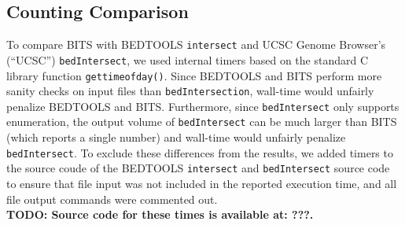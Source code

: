 \subsection{Counting Comparison}
To compare BITS with BEDTOOLS {\tt intersect} and UCSC Genome Browser’s
(``UCSC'') {\tt bedIntersect}, we used internal timers based on the standard C
library function {\tt gettimeofday()}.  Since BEDTOOLS and BITS perform more
sanity checks on input files than {\tt bedIntersection}, wall-time would
unfairly penalize BEDTOOLS and BITS.  Furthermore, since {\tt bedIntersect} only
supports enumeration, the output volume of {\tt bedIntersect} can be much larger
than BITS (which reports a single number) and wall-time would unfairly penalize
{\tt bedIntersect}.  To exclude these differences from the results, we added
timers to the source coude of the BEDTOOLS {\tt intersect} and 
{\tt bedIntersect} source code to ensure that file input was not included in the
reported execution time, and all file output commands were commented out.\\
\textbf{TODO: Source code for these times is available at: ???.}